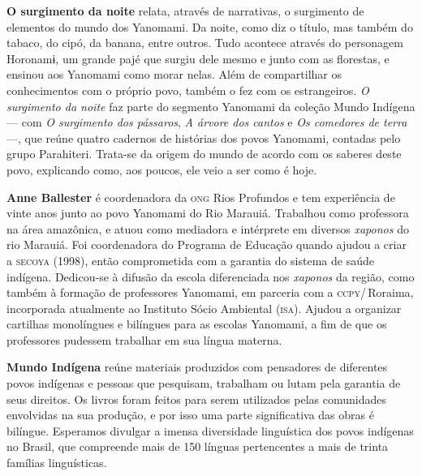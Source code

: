 \textbf{O surgimento da noite} relata, através de narrativas, o surgimento de elementos do mundo dos Yanomami. Da noite, como diz o título, mas também do tabaco, do cipó, da banana, entre outros. Tudo acontece através do personagem Horonamɨ, um grande pajé que surgiu dele mesmo e junto com as florestas, e ensinou aos Yanomami como morar nelas. Além de compartilhar os conhecimentos com o próprio povo, também o fez com os estrangeiros. \textit{O surgimento da noite} faz parte do segmento Yanomami da coleção Mundo Indígena --- com \textit{O surgimento dos pássaros}, \textit{A árvore dos cantos} e \textit{Os comedores de terra} ---, que reúne quatro cadernos de histórias dos povos Yanomami, contadas pelo grupo Parahiteri. Trata-se da origem do mundo de acordo com os saberes deste povo, explicando como, aos poucos, ele veio a ser como é hoje.

\textbf{Anne Ballester} é coordenadora da \textsc{ong} Rios Profundos e tem experiência de vinte anos junto ao povo Yanomami do Rio Marauiá. Trabalhou como professora na área amazônica, e atuou como mediadora e intérprete em diversos \textit{xaponos} do rio Marauiá. Foi coordenadora do Programa de Educação quando ajudou a criar a \textsc{secoya} (1998), então comprometida com a garantia do sistema de saúde indígena. Dedicou-se à difusão da escola diferenciada nos \textit{xaponos} da região, como também à formação de professores Yanomami, em parceria com a \textsc{ccpy}/\,Roraima, incorporada atualmente ao Instituto Sócio Ambiental (\textsc{isa}). Ajudou a organizar cartilhas monolíngues e bilíngues para as escolas Yanomami, a fim de que os professores pudessem trabalhar em sua língua materna.

\textbf{Mundo Indígena} reúne materiais produzidos com pensadores de diferentes povos indígenas e pessoas que pesquisam, trabalham ou lutam pela garantia de seus direitos. Os livros foram feitos para serem utilizados pelas comunidades envolvidas na sua produção, e por isso uma parte significativa das obras é bilíngue. Esperamos divulgar a imensa diversidade linguística dos povos indígenas no Brasil, que compreende mais de 150 línguas pertencentes a mais de trinta famílias linguísticas.



